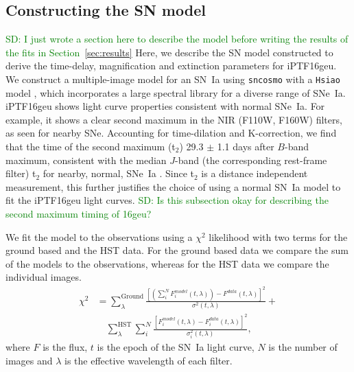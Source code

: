 \documentclass[a4paper,fleqn,usenatbib]{mnras}
\newcommand{\sd}[1]{\textcolor{green}{SD: #1}}
\begin{document}
\subsection{Constructing the SN model}
\sd{I just wrote a section here to describe the model before writing the results of the fits in Section~\ref{sec:results}}
Here, we describe the SN model constructed to derive the time-delay, magnification and extinction parameters for iPTF16geu. We construct a multiple-image model for an SN~Ia using \texttt{sncosmo} with a \texttt{Hsiao} model \citep{2007ApJ...663.1187H}, which incorporates a large spectral library for a diverse range of SNe~Ia. iPTF16geu shows light curve properties consistent with normal SNe~Ia. For example, it shows a clear second maximum in the NIR (F110W, F160W) filters, as seen for nearby SNe. Accounting for time-dilation and K-correction, we find that the time of the second maximum (t$_2$)  29.3 $\pm$ 1.1 days after $B$-band maximum, consistent with the median $J$-band (the corresponding rest-frame filter) t$_2$ for nearby, normal, SNe~Ia \citep{2012A&A...537A..57B, 2015MNRAS.448.1345D}. Since t$_2$ is a distance independent measurement, this further justifies the choice of using a normal SN~Ia model to fit the iPTF16geu light curves. \sd{Is this subsection okay for describing the second maximum timing of 16geu?}

  We fit the model to the observations using a $\chi^2$ likelihood with two terms for the ground based and the HST data. For the ground based data we compare the sum of the models to the observations, whereas for the HST data we compare the individual images. 
\begin{equation}
\label{eq:chi}
\begin{aligned}
\chi ^2 &= \sum_{\lambda}^{\mathrm{Ground}}\frac{\left[\left(\sum_i^{N} F_i^{model}(t,\lambda)\right)-F^{data}(t,\lambda)\right]^2}{\sigma^2(t,\lambda)}+ \\
&\quad \sum_{\lambda}^{\mathrm{HST}}\sum_i^{N}\frac{\left[F_i^{model}(t,\lambda)-F_i^{data}(t,\lambda)\right]^2}{\sigma_i^2(t,\lambda)},
\end{aligned}
\end{equation}
where $F$ is the flux, $t$ is the epoch of the SN~Ia light curve, $N$ is the number of images and $\lambda$ is the effective wavelength of each filter. 
\end{document}

